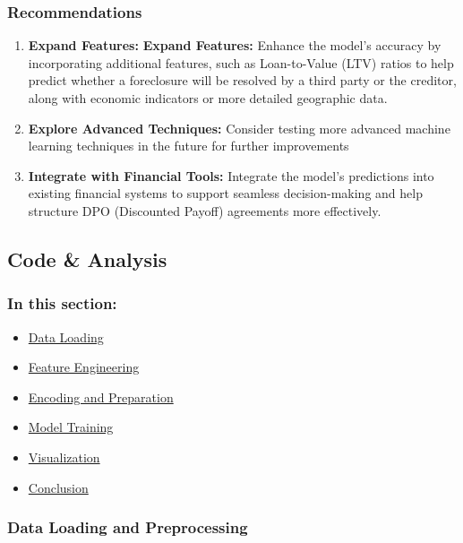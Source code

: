 \documentclass[
  letterpaper,
  DIV=11,
  numbers=noendperiod]{scrartcl}
\providecommand{\tightlist}{%
  \setlength{\itemsep}{0pt}\setlength{\parskip}{0pt}}\usepackage{longtable,booktabs,array}
\begin{document}
\subsubsection{Recommendations}\label{sec-recommendations}

\begin{enumerate}
\def\labelenumi{\arabic{enumi}.}
\item
  \textbf{Expand Features:} \textbf{Expand Features:} Enhance the
  model's accuracy by incorporating additional features, such as
  Loan-to-Value (LTV) ratios to help predict whether a foreclosure will
  be resolved by a third party or the creditor, along with economic
  indicators or more detailed geographic data.
\item
  \textbf{Explore Advanced Techniques:} Consider testing more advanced
  machine learning techniques in the future for further improvements
\item
  \textbf{Integrate with Financial Tools:} Integrate the model's
  predictions into existing financial systems to support seamless
  decision-making and help structure DPO (Discounted Payoff) agreements
  more effectively.
\end{enumerate}

\subsection{Code \& Analysis}

\subsubsection{In this section:}\label{in-this-section}

\begin{itemize}
\tightlist
\item
  \hyperref[sec-data-loading]{Data Loading}
\item
  \hyperref[sec-feature-engineering]{Feature Engineering}
\item
  \hyperref[sec-encoding]{Encoding and Preparation}
\item
  \hyperref[sec-model-training]{Model Training}
\item
  \hyperref[sec-visualization]{Visualization}
\item
  \hyperref[sec-conclusion]{Conclusion}
\end{itemize}

\subsubsection{Data Loading and Preprocessing}\label{sec-data-loading}
\end{document}

